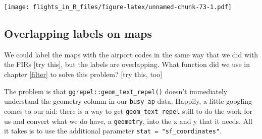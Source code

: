 \documentclass[
]{book}
\newenvironment{Shaded}{\begin{snugshade}}{\end{snugshade}}
\newcommand{\AttributeTok}[1]{\textcolor[rgb]{0.77,0.63,0.00}{#1}}
\newcommand{\CommentTok}[1]{\textcolor[rgb]{0.56,0.35,0.01}{\textit{#1}}}
\newcommand{\FloatTok}[1]{\textcolor[rgb]{0.00,0.00,0.81}{#1}}
\newcommand{\FunctionTok}[1]{\textcolor[rgb]{0.00,0.00,0.00}{#1}}
\newcommand{\NormalTok}[1]{#1}
\newcommand{\OtherTok}[1]{\textcolor[rgb]{0.56,0.35,0.01}{#1}}
\newcommand{\SpecialCharTok}[1]{\textcolor[rgb]{0.00,0.00,0.00}{#1}}
\newcommand{\StringTok}[1]{\textcolor[rgb]{0.31,0.60,0.02}{#1}}
\begin{document}
\begin{Shaded}
\end{Shaded}

\texttt{[image: flights\_in\_R\_files/figure-latex/unnamed-chunk-73-1.pdf]}

\hypertarget{mapOverlapLabels}{%
\subsection{Overlapping labels on maps}\label{mapOverlapLabels}}

We could label the maps with the airport codes in the same way that we did with the FIRs {[}try this{]}, but the labels are overlapping. What function did we use in chapter \ref{filter} to solve this problem? {[}try this, too{]}

The problem is that \texttt{ggrepel::geom\_text\_repel()} doesn't immediately understand the geometry column in our \texttt{busy\_ap} data. Happily, a little googling comes to our aid: there is a way to get \texttt{geom\_text\_repel} still to do the work for us and convert what we do have, a \texttt{geometry}, into the x and y that it needs. All it takes is to use the additional parameter \texttt{stat\ =\ "sf\_coordinates"}.
\end{document}
